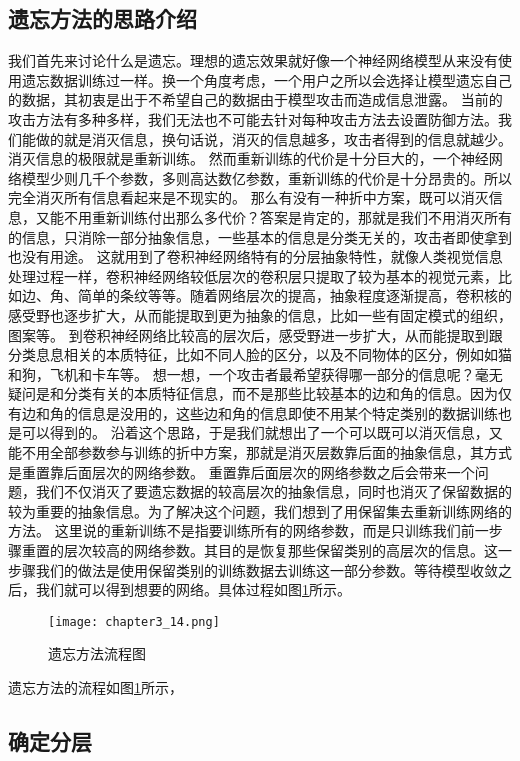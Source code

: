 \subsection{遗忘方法的思路介绍}
我们首先来讨论什么是遗忘。理想的遗忘效果就好像一个神经网络模型从来没有使用遗忘数据训练过一样。换一个角度考虑，一个用户之所以会选择让模型遗忘自己的数据，其初衷是出于不希望自己的数据由于模型攻击而造成信息泄露。
当前的攻击方法有多种多样，我们无法也不可能去针对每种攻击方法去设置防御方法。我们能做的就是消灭信息，换句话说，消灭的信息越多，攻击者得到的信息就越少。消灭信息的极限就是重新训练。
然而重新训练的代价是十分巨大的，一个神经网络模型少则几千个参数，多则高达数亿参数，重新训练的代价是十分昂贵的。所以完全消灭所有信息看起来是不现实的。
那么有没有一种折中方案，既可以消灭信息，又能不用重新训练付出那么多代价？答案是肯定的，那就是我们不用消灭所有的信息，只消除一部分抽象信息，一些基本的信息是分类无关的，攻击者即使拿到也没有用途。
这就用到了卷积神经网络特有的分层抽象特性，就像人类视觉信息处理过程一样，卷积神经网络较低层次的卷积层只提取了较为基本的视觉元素，比如边、角、简单的条纹等等。随着网络层次的提高，抽象程度逐渐提高，卷积核的感受野也逐步扩大，从而能提取到更为抽象的信息，比如一些有固定模式的组织，图案等。
到卷积神经网络比较高的层次后，感受野进一步扩大，从而能提取到跟分类息息相关的本质特征，比如不同人脸的区分，以及不同物体的区分，例如如猫和狗，飞机和卡车等。
想一想，一个攻击者最希望获得哪一部分的信息呢？毫无疑问是和分类有关的本质特征信息，而不是那些比较基本的边和角的信息。因为仅有边和角的信息是没用的，这些边和角的信息即使不用某个特定类别的数据训练也是可以得到的。
沿着这个思路，于是我们就想出了一个可以既可以消灭信息，又能不用全部参数参与训练的折中方案，那就是消灭层数靠后面的抽象信息，其方式是重置靠后面层次的网络参数。
重置靠后面层次的网络参数之后会带来一个问题，我们不仅消灭了要遗忘数据的较高层次的抽象信息，同时也消灭了保留数据的较为重要的抽象信息。为了解决这个问题，我们想到了用保留集去重新训练网络的方法。
这里说的重新训练不是指要训练所有的网络参数，而是只训练我们前一步骤重置的层次较高的网络参数。其目的是恢复那些保留类别的高层次的信息。这一步骤我们的做法是使用保留类别的训练数据去训练这一部分参数。等待模型收敛之后，我们就可以得到想要的网络。具体过程如图\ref{fig:chapter3_14}所示。
\begin{figure}
    \centering
    \texttt{[image: chapter3\_14.png]}
    \caption{遗忘方法流程图}
    \label{fig:chapter3_14}
\end{figure}
遗忘方法的流程如图\ref{fig:chapter3_14}所示，

\subsection{确定分层}


